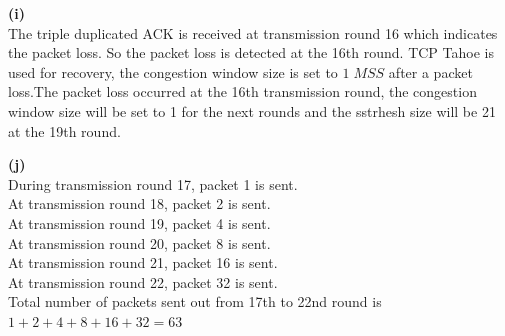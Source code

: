 \documentclass{article}
\begin{document}
\bigskip
{\bf (i)}\\
The triple duplicated ACK is received at transmission round 16 which indicates the packet loss. So the packet loss is detected at the 16th round. TCP Tahoe is used for recovery, the congestion window size is set to $1 \; MSS$ after a packet loss.The packet loss occurred at the 16th transmission round, the congestion window size will be set to 1 for the next rounds and the sstrhesh size will be 21 at the 19th round.

\bigskip
{\bf (j)}\\
During transmission round 17, packet 1 is sent.\\
At transmission round 18, packet 2 is sent.\\
At transmission round 19, packet 4 is sent.\\
At transmission round 20, packet 8 is sent.\\
At transmission round 21, packet 16 is sent.\\
At transmission round 22, packet 32 is sent.\\
Total number of packets sent out from 17th to 22nd round is $1+2+4+8+16+32=63$
\end{document}
